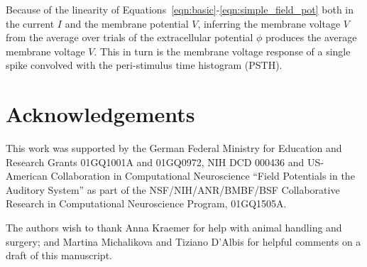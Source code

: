 \documentclass[]{elife}
\begin{document}
Because of the linearity of Equations~\ref{eqn:basic}-\ref{eqn:simple_field_pot} both in the current \(I\) and
the membrane potential \(V\), inferring the membrane voltage \(V\) from
the average over trials of the extracellular potential \(\phi\) produces
the average membrane voltage \(V\). This in turn is the membrane voltage
response of a single spike convolved with the peri-stimulus time
histogram (PSTH).

\section{Acknowledgements}\label{acknowledgements}

This work was supported by the German Federal Ministry for Education and
Research Grants 01GQ1001A and 01GQ0972, NIH DCD 000436 and US-American
Collaboration in Computational Neuroscience ``Field Potentials in the
Auditory System'' as part of the NSF/NIH/ANR/BMBF/BSF Collaborative
Research in Computational Neuroscience Program, 01GQ1505A.

The authors wish to thank Anna Kraemer for help with animal handling and
surgery; and Martina Michalikova and Tiziano D'Albis for helpful
comments on a draft of this manuscript.

\renewcommand\refname{Bibliography}

\end{document}
